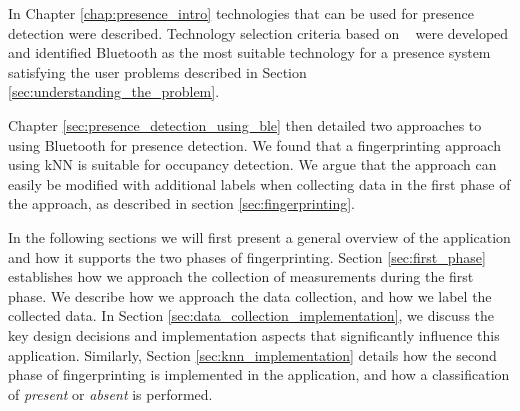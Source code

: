 In Chapter \ref{chap:presence_intro} technologies that can be used for presence detection were described. 
Technology selection criteria based on \citeauthor{presence_ble_review}~\cite{presence_ble_review} were developed and identified Bluetooth as the most suitable technology for a presence system satisfying the user problems described in Section \ref{sec:understanding_the_problem}.

Chapter \ref{sec:presence_detection_using_ble} then detailed two approaches to using Bluetooth for presence detection. 
We found that a fingerprinting approach using kNN is suitable for occupancy detection. 
We argue that the approach can easily be modified with additional labels when collecting data in the first phase of the approach, as described in section \ref{sec:fingerprinting}.

In the following sections we will first present a general overview of the application and how it supports the two phases of fingerprinting. 
Section \ref{sec:first_phase} establishes how we approach the collection of measurements during the first phase. 
We describe how we approach the data collection, and how we label the collected data.
In Section \ref{sec:data_collection_implementation}, we discuss the key design decisions and implementation aspects that significantly influence this application.
Similarly, Section \ref{sec:knn_implementation} details how the second phase of fingerprinting is implemented in the application, and how a classification of \textit{present} or \textit{absent} is performed.



